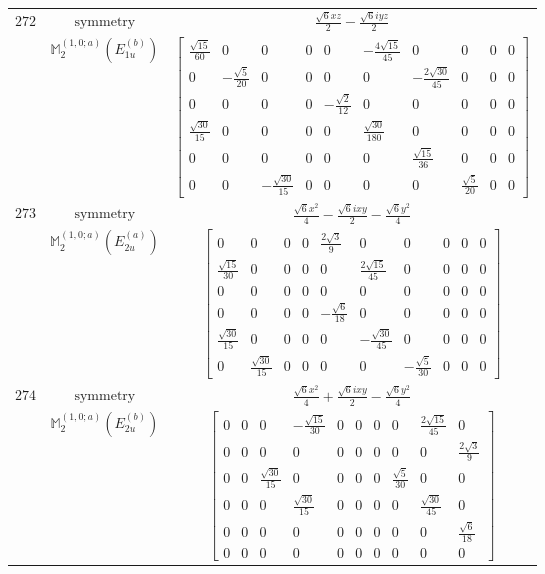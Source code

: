 \documentclass[fleqn,8pt,landscape]{jsarticle}
\begin{document}
\begin{longtable}{ccc}
$ 272 $ & $ \text{symmetry} $ & $ \frac{\sqrt{6} x z}{2} - \frac{\sqrt{6} i y z}{2} $ \\
$  $ & $ \mathbb{M}_{2}^{(1,0;a)}(E_{1u}^{(b)}) $ & $ \begin{bmatrix} \frac{\sqrt{15}}{60} & 0 & 0 & 0 & 0 & - \frac{4 \sqrt{15}}{45} & 0 & 0 & 0 & 0 \\ 0 & - \frac{\sqrt{5}}{20} & 0 & 0 & 0 & 0 & - \frac{2 \sqrt{30}}{45} & 0 & 0 & 0 \\ 0 & 0 & 0 & 0 & - \frac{\sqrt{2}}{12} & 0 & 0 & 0 & 0 & 0 \\ \frac{\sqrt{30}}{15} & 0 & 0 & 0 & 0 & \frac{\sqrt{30}}{180} & 0 & 0 & 0 & 0 \\ 0 & 0 & 0 & 0 & 0 & 0 & \frac{\sqrt{15}}{36} & 0 & 0 & 0 \\ 0 & 0 & - \frac{\sqrt{30}}{15} & 0 & 0 & 0 & 0 & \frac{\sqrt{5}}{20} & 0 & 0 \end{bmatrix} $ \\ \hline
$ 273 $ & $ \text{symmetry} $ & $ \frac{\sqrt{6} x^{2}}{4} - \frac{\sqrt{6} i x y}{2} - \frac{\sqrt{6} y^{2}}{4} $ \\
$  $ & $ \mathbb{M}_{2}^{(1,0;a)}(E_{2u}^{(a)}) $ & $ \begin{bmatrix} 0 & 0 & 0 & 0 & \frac{2 \sqrt{3}}{9} & 0 & 0 & 0 & 0 & 0 \\ \frac{\sqrt{15}}{30} & 0 & 0 & 0 & 0 & \frac{2 \sqrt{15}}{45} & 0 & 0 & 0 & 0 \\ 0 & 0 & 0 & 0 & 0 & 0 & 0 & 0 & 0 & 0 \\ 0 & 0 & 0 & 0 & - \frac{\sqrt{6}}{18} & 0 & 0 & 0 & 0 & 0 \\ \frac{\sqrt{30}}{15} & 0 & 0 & 0 & 0 & - \frac{\sqrt{30}}{45} & 0 & 0 & 0 & 0 \\ 0 & \frac{\sqrt{30}}{15} & 0 & 0 & 0 & 0 & - \frac{\sqrt{5}}{30} & 0 & 0 & 0 \end{bmatrix} $ \\ \hline
$ 274 $ & $ \text{symmetry} $ & $ \frac{\sqrt{6} x^{2}}{4} + \frac{\sqrt{6} i x y}{2} - \frac{\sqrt{6} y^{2}}{4} $ \\
$  $ & $ \mathbb{M}_{2}^{(1,0;a)}(E_{2u}^{(b)}) $ & $ \begin{bmatrix} 0 & 0 & 0 & - \frac{\sqrt{15}}{30} & 0 & 0 & 0 & 0 & \frac{2 \sqrt{15}}{45} & 0 \\ 0 & 0 & 0 & 0 & 0 & 0 & 0 & 0 & 0 & \frac{2 \sqrt{3}}{9} \\ 0 & 0 & \frac{\sqrt{30}}{15} & 0 & 0 & 0 & 0 & \frac{\sqrt{5}}{30} & 0 & 0 \\ 0 & 0 & 0 & \frac{\sqrt{30}}{15} & 0 & 0 & 0 & 0 & \frac{\sqrt{30}}{45} & 0 \\ 0 & 0 & 0 & 0 & 0 & 0 & 0 & 0 & 0 & \frac{\sqrt{6}}{18} \\ 0 & 0 & 0 & 0 & 0 & 0 & 0 & 0 & 0 & 0 \end{bmatrix} $ \\ \hline

\end{longtable}
\end{document}
